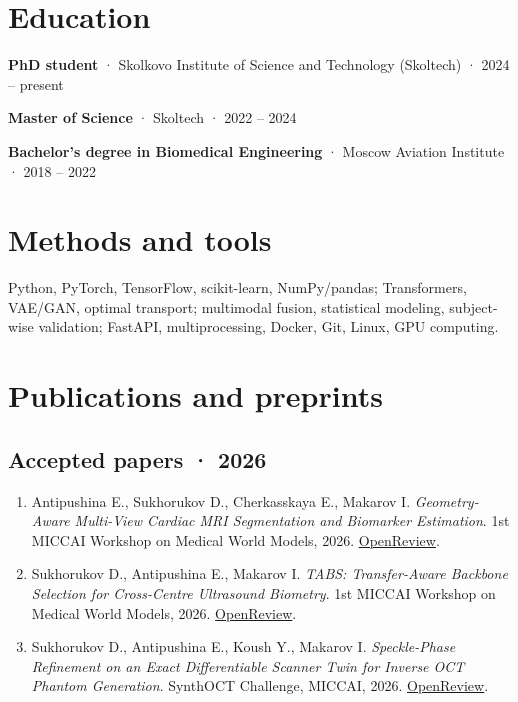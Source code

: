 \documentclass[10pt,a4paper]{article}
\begin{document}
\section{Education}
\textbf{PhD student} · Skolkovo Institute of Science and Technology (Skoltech) · 2024 – present\par\vspace{3pt}
\textbf{Master of Science} · Skoltech · 2022 – 2024\par\vspace{3pt}
\textbf{Bachelor’s degree in Biomedical Engineering} · Moscow Aviation Institute · 2018 – 2022\par\vspace{3pt}
\section{Methods and tools}
Python, PyTorch, TensorFlow, scikit-learn, NumPy/pandas; Transformers, VAE/GAN, optimal transport; multimodal fusion, statistical modeling, subject-wise validation; FastAPI, multiprocessing, Docker, Git, Linux, GPU computing.\par
\newpage\section{Publications and preprints}
\begingroup\fontsize{10.2}{12.5}\selectfont
\subsection*{Accepted papers · 2026}
\begin{enumerate}
\item Antipushina E., Sukhorukov D., Cherkasskaya E., Makarov I. \textit{Geometry-Aware Multi-View Cardiac MRI Segmentation and Biomarker Estimation}. 1st MICCAI Workshop on Medical World Models, 2026. \href{https://openreview.net/forum?id=8fgjDHh6FH}{OpenReview}.
\item Sukhorukov D., Antipushina E., Makarov I. \textit{TABS: Transfer-Aware Backbone Selection for Cross-Centre Ultrasound Biometry}. 1st MICCAI Workshop on Medical World Models, 2026. \href{https://openreview.net/forum?id=5IcejzMtsU}{OpenReview}.
\item Sukhorukov D., Antipushina E., Koush Y., Makarov I. \textit{Speckle-Phase Refinement on an Exact Differentiable Scanner Twin for Inverse OCT Phantom Generation}. SynthOCT Challenge, MICCAI, 2026. \href{https://openreview.net/forum?id=eT8xnrF58D}{OpenReview}.
\end{enumerate}
\end{document}
